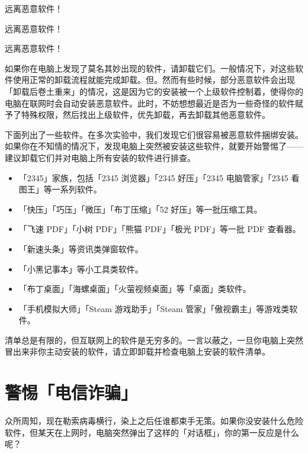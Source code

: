 \begin{dangerbox}
  \centering
  远离恶意软件！\par
  \large 远离恶意软件！\par
  \LARGE 远离恶意软件！\par
\end{dangerbox}

如果你在电脑上发现了莫名其妙出现的软件，请卸载它们。一般情况下，对这些软件使用正常的卸载流程就能完成卸载。但。然而有些时候，部分恶意软件会出现「卸载后卷土重来」的情况，这是因为它的安装被一个上级软件控制着，使得你的电脑在联网时会自动安装恶意软件。此时，不妨想想最近是否为一些奇怪的软件赋予了特殊权限，然后找出上级软件，优先卸载，再去卸载其他恶意软件。

下面列出了一些软件。在多次实验中，我们发现它们很容易被恶意软件捆绑安装。如果你在不知情的情况下，发现电脑上突然被安装这些软件，就要开始警惕了——建议卸载它们并对电脑上所有安装的软件进行排查。

\begin{itemize}
  \item 「2345」家族，包括「2345 浏览器」「2345 好压」「2345 电脑管家」「2345 看图王」等一系列软件。
  \item 「快压」「巧压」「微压」「布丁压缩」「52 好压」等一批压缩工具。
  \item 「飞速 PDF」「小树 PDF」「熊猫 PDF」「极光 PDF」等一批 PDF 查看器。
  \item 「新速头条」等资讯类弹窗软件。
  \item 「小黑记事本」等小工具类软件。
  \item 「布丁桌面」「海螺桌面」「火萤视频桌面」等「桌面」类软件。
  \item 「手机模拟大师」「Steam 游戏助手」「Steam 管家」「傲视霸主」等游戏类软件。
\end{itemize}

清单总是有限的，但互联网上的软件是无穷多的。一言以蔽之，一旦你电脑上突然冒出来非你主动安装的软件，请立即卸载并检查电脑上安装的软件清单。

\section{警惕「电信诈骗」}

众所周知，现在勒索病毒横行，染上之后任谁都束手无策。如果你没安装什么危险软件，但某天在上网时，电脑突然弹出了这样的「对话框」，你的第一反应是什么呢？

